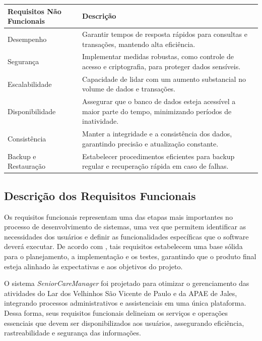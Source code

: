 \begin{quadro}[H]
	\centering
	\caption{Requisitos Não Funcionais}
	\label{quad:requisitos_nao_funcionais}
	\begin{tabularx}{\textwidth}{|l|X|}
		\hline
		\textbf{Requisitos Não Funcionais} & \textbf{Descrição} \\ \hline
		
		Desempenho & Garantir tempos de resposta rápidos para consultas e transações, mantendo alta eficiência. \\ \hline
		
		Segurança & Implementar medidas robustas, como controle de acesso e criptografia, para proteger dados sensíveis. \\ \hline
		
		Escalabilidade & Capacidade de lidar com um aumento substancial no volume de dados e transações. \\ \hline
		
		Disponibilidade & Assegurar que o banco de dados esteja acessível a maior parte do tempo, minimizando períodos de inatividade. \\ \hline
		
		Consistência & Manter a integridade e a consistência dos dados, garantindo precisão e atualização constante. \\ \hline
		
		Backup e Restauração & Estabelecer procedimentos eficientes para backup regular e recuperação rápida em caso de falhas. \\ \hline
	\end{tabularx}
	
\end{quadro}


\subsection{Descrição dos Requisitos Funcionais}

Os requisitos funcionais representam uma das etapas mais importantes no processo de desenvolvimento de sistemas, uma vez que permitem identificar as necessidades dos usuários e definir as funcionalidades específicas que o software deverá executar. De acordo com \textcite{Sommerville2018ES10}, tais requisitos estabelecem uma base sólida para o planejamento, a implementação e os testes, garantindo que o produto final esteja alinhado às expectativas e aos objetivos do projeto.

O sistema \textit{SeniorCareManager} foi projetado para otimizar o gerenciamento das atividades do Lar dos Velhinhos São Vicente de Paulo e da APAE de Jales, integrando processos administrativos e assistenciais em uma única plataforma. Dessa forma, seus requisitos funcionais delineiam os serviços e operações essenciais que devem ser disponibilizados aos usuários, assegurando eficiência, rastreabilidade e segurança das informações.

